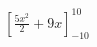 \documentclass[preview]{standalone}
\begin{document}
\begin{align*}
\left[\frac{5 x^{2}}{2} + 9 x\right]_{-10}^{10}
\end{align*}
\end{document}
